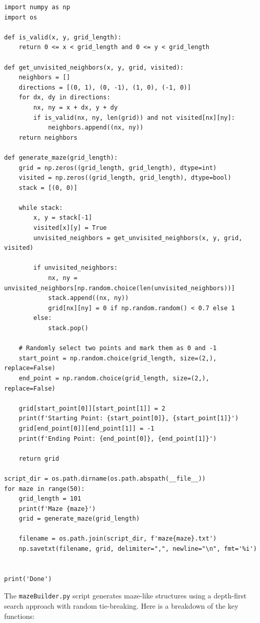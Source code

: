 \begin{verbatim}
import numpy as np
import os

def is_valid(x, y, grid_length):
    return 0 <= x < grid_length and 0 <= y < grid_length

def get_unvisited_neighbors(x, y, grid, visited):
    neighbors = []
    directions = [(0, 1), (0, -1), (1, 0), (-1, 0)]
    for dx, dy in directions:
        nx, ny = x + dx, y + dy
        if is_valid(nx, ny, len(grid)) and not visited[nx][ny]:
            neighbors.append((nx, ny))
    return neighbors

def generate_maze(grid_length):
    grid = np.zeros((grid_length, grid_length), dtype=int)
    visited = np.zeros((grid_length, grid_length), dtype=bool)
    stack = [(0, 0)]

    while stack:
        x, y = stack[-1]
        visited[x][y] = True
        unvisited_neighbors = get_unvisited_neighbors(x, y, grid, visited)

        if unvisited_neighbors:
            nx, ny = unvisited_neighbors[np.random.choice(len(unvisited_neighbors))]
            stack.append((nx, ny))
            grid[nx][ny] = 0 if np.random.random() < 0.7 else 1
        else:
            stack.pop()

    # Randomly select two points and mark them as 0 and -1
    start_point = np.random.choice(grid_length, size=(2,), replace=False)
    end_point = np.random.choice(grid_length, size=(2,), replace=False)

    grid[start_point[0]][start_point[1]] = 2
    print(f'Starting Point: {start_point[0]}, {start_point[1]}')
    grid[end_point[0]][end_point[1]] = -1
    print(f'Ending Point: {end_point[0]}, {end_point[1]}')

    return grid

script_dir = os.path.dirname(os.path.abspath(__file__))
for maze in range(50):
    grid_length = 101
    print(f'Maze {maze}')
    grid = generate_maze(grid_length)

    filename = os.path.join(script_dir, f'maze{maze}.txt')
    np.savetxt(filename, grid, delimiter=",", newline="\n", fmt='%i')
    

print('Done')
\end{verbatim}
The \texttt{mazeBuilder.py} script generates maze-like structures using a depth-first search approach with random tie-breaking. Here is a breakdown of the key functions:

